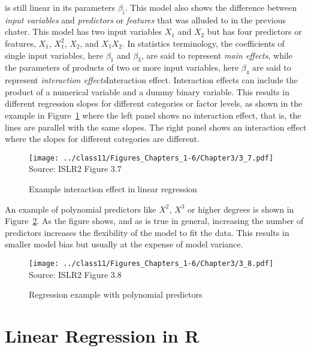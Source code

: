 \noindent is still linear in its parameters $\beta_i$. This model also shows the difference between \emph{input variables} and \emph{predictors} or \emph{features} that was alluded to in the previous chater. This model has two input variables $X_1$ and $X_2$ but has four predictors or features, $X_1$, $X_1^2$, $X_2$, and $X_1 X_2$. In statistics terminology, the coefficients of single input variables, here $\beta_1$ and $\beta_3$, are said to represent \emph{main effects}, while the parameters of products of two or more input variables, here $\beta_4$ are said to represent \emph{interaction effects}{Interaction effect}. Interaction effects can include the product of a numerical variable and a dummy binary variable. This results in different regression slopes for different categories or factor levels, as shown in the example in Figure~\ref{fig:groupinteraction} where the left panel shows no interaction effect, that is, the lines are parallel with the same slopes. The right panel shows an interaction effect where the slopes for different categories are different.

\begin{figure}
\centering
\texttt{[image: ../class11/Figures\_Chapters\_1-6/Chapter3/3\_7.pdf]} \\

\scriptsize Source: ISLR2 Figure 3.7
\caption{Example interaction effect in linear regression}
\label{fig:groupinteraction}
\end{figure}

An example of polynomial predictors like $X^2$, $X^3$ or higher degrees is shown in Figure~\ref{fig:polynomial_chap12}. As the figure shows, and as is true in general, increasing the number of predictors increases the flexibility of the model to fit the data. This results in smaller model bias but usually at the expense of model variance. 

\begin{figure}
\centering

\texttt{[image: ../class11/Figures\_Chapters\_1-6/Chapter3/3\_8.pdf]} \\

\scriptsize Source: ISLR2 Figure 3.8
\caption{Regression example with polynomial predictors}
\label{fig:polynomial_chap12}
\end{figure}


\FloatBarrier
\section{Linear Regression in R}

